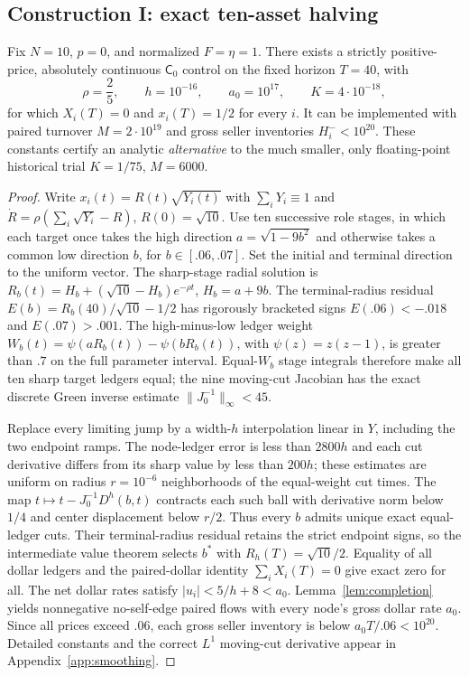 \documentclass[review,hidelinks,onefignum,onetabnum]{siamonline250211}%
\begin{document}
\subsection{Construction I: exact ten-asset halving}\label{sec:conI}
\begin{theorem}
\label{thm:tenhalf}
Fix $N=10$, $p=0$, and normalized $F=\eta=1$.
There exists a strictly positive-price, absolutely continuous
$\mathsf C_0$ control on the fixed horizon $T=40$, with
\begin{equation}\label{eq:tenhalfcert}
 \rho=\frac25,\qquad h=10^{-16},\qquad
 a_0=10^{17},\qquad K=4\cdot10^{-18},
\end{equation}
for which $X_i(T)=0$ and $x_i(T)=1/2$ for every $i$.
It can be implemented with paired turnover
$M=2\cdot10^{19}$ and gross seller inventories
$H_i^-<10^{20}$. These constants certify an analytic
\emph{alternative} to the much smaller, only floating-point
historical trial $K=1/75$, $M=6000$.
\end{theorem}
\begin{proof}
Write $x_i(t)=R(t)\sqrt{Y_i(t)}$ with
$\sum_iY_i\equiv1$ and
$\dot R=\rho(\sum_i\sqrt{Y_i}-R)$, $R(0)=\sqrt{10}$.
Use ten successive role stages, in which each target once takes
the high direction $a=\sqrt{1-9b^2}$ and otherwise takes a common
low direction $b$, for $b\in[.06,.07]$. Set the initial and
terminal direction to the uniform vector. The sharp-stage radial
solution is $R_b(t)=H_b+(\sqrt{10}-H_b)e^{-\rho t}$,
$H_b=a+9b$. The terminal-radius residual
$E(b)=R_b(40)/\sqrt{10}-1/2$ has rigorously bracketed signs
$E(.06)<-.018$ and $E(.07)>.001$.
The high-minus-low ledger weight
$W_b(t)=\psi(aR_b(t))-\psi(bR_b(t))$, with
$\psi(z)=z(z-1)$, is greater than $.7$ on the full parameter
interval. Equal-$W_b$ stage integrals therefore make all ten
sharp target ledgers equal; the nine moving-cut Jacobian has the
exact discrete Green inverse estimate
$\|J_0^{-1}\|_\infty<45$.

Replace every limiting jump by a width-$h$ interpolation linear
in $Y$, including the two endpoint ramps. The node-ledger error
is less than $2800h$ and each cut derivative differs from its
sharp value by less than $200h$; these estimates are uniform on
radius $r=10^{-6}$ neighborhoods of the equal-weight cut times.
The map $t\mapsto t-J_0^{-1}D^h(b,t)$ contracts each such ball
with derivative norm below $1/4$ and center displacement below
$r/2$. Thus every $b$ admits unique exact equal-ledger cuts.
Their terminal-radius residual retains the strict endpoint signs,
so the intermediate value theorem selects $b^*$ with
$R_h(T)=\sqrt{10}/2$. Equality of all dollar ledgers and the
paired-dollar identity $\sum_iX_i(T)=0$ give exact zero for all.
The net dollar rates satisfy $|u_i|<5/h+8<a_0$.
Lemma~\ref{lem:completion} yields nonnegative no-self-edge
paired flows with every node's gross dollar rate $a_0$.
Since all prices exceed $.06$, each gross seller inventory is
below $a_0T/.06<10^{20}$. Detailed constants and the correct
$L^1$ moving-cut derivative appear in Appendix~\ref{app:smoothing}.
\end{proof}
\end{document}
